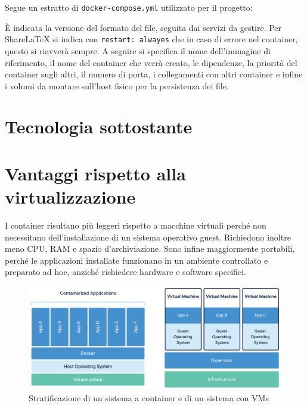 Segue un estratto di \verb|docker-compose.yml| utilizzato per il progetto:

È indicata la versione del formato del file, seguita dai servizi da gestire. Per ShareLaTeX si indica con \verb|restart: alwayes| che in caso di errore nel container, questo si riavverà sempre. A seguire si specifica il nome dell'immagine di riferimento, il nome del container che verrà creato, le dipendenze, la priorità del container sugli altri, il numero di porta, i collegamenti con altri container e infine i volumi da montare sull'host fisico per la persistenza dei file.
 
\section{Tecnologia sottostante}


\section{Vantaggi rispetto alla virtualizzazione}
I container risultano più leggeri rispetto a macchine virtuali perché non necessitano dell'installazione di un sistema operativo guest. Richiedono inoltre meno CPU, RAM e spazio d'archiviazione. Sono infine maggiormente portabili, perché le applicazioni installate funzionano in un ambiente controllato e preparato ad hoc, anziché richiedere hardware e software specifici.
\begin{figure}[h]
    \centering
    \includegraphics[width=\textwidth]{immagini/docker-containerized-and-vm-transparent-bg.png}
    \caption{Stratificazione di un sistema a container e di un sistema con VMs}
    \label{fig:container-vs-VM}
\end{figure}